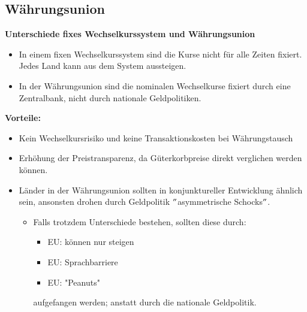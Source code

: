 \subsection{Währungsunion}
\textbf{Unterschiede fixes Wechselkurssystem und Währungsunion}\\
\begin{itemize}
	\item In einem fixen Wechselkurssystem sind die Kurse nicht für alle Zeiten fixiert. Jedes Land kann aus dem System aussteigen.
	\item In der Währungsunion sind die nominalen Wechselkurse fixiert durch eine Zentralbank, nicht durch nationale Geldpolitiken.
\end{itemize}
\textbf{Vorteile:}\\
\begin{itemize}
	\item Kein Wechselkursrisiko und keine Transaktionskosten bei Währungstausch
	\item Erhöhung der Preistransparenz, da Güterkorbpreise direkt verglichen werden können.
	\item Länder in der Währungsunion sollten in konjunktureller Entwicklung ähnlich sein, ansonsten drohen durch Geldpolitik $"$asymmetrische Schocks$"$.
	\begin{itemize}
		\item Falls trotzdem Unterschiede bestehen, sollten diese durch:
		\begin{itemize}
			\item{} EU: können nur steigen
			\item{} EU: Sprachbarriere 
			\item{} EU: "Peanuts"
		\end{itemize}
		 aufgefangen werden; anstatt durch die nationale Geldpolitik.
	\end{itemize}
\end{itemize}
\vspace{\baselineskip}
